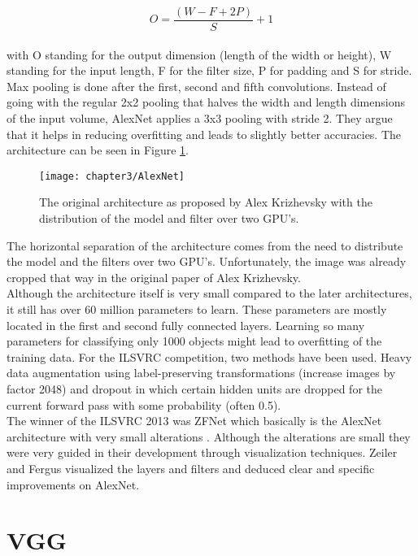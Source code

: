 \[ O = {\frac{(W - F + 2P)}{S}} + 1 \] \\

with O standing for the output dimension (length of the width or height), W standing for the input length, F for the filter size, P for padding and S for stride. Max pooling is done after the first, second and fifth convolutions. Instead of going with the regular 2x2 pooling that halves the width and length dimensions of the input volume, AlexNet applies a 3x3 pooling with stride 2. They argue that it helps in reducing overfitting and leads to slightly better accuracies. The architecture can be seen in Figure \ref{fig:AlexNet}. \\

\begin{figure}[H]
  \centering
  \caption{The original architecture as proposed by Alex Krizhevsky with the distribution of the model and filter over two GPU's. \cite{krizhevsky2012imagenet}}
  \texttt{[image: chapter3/AlexNet]}
  \label{fig:AlexNet}
\end{figure}

The horizontal separation of the architecture comes from the need to distribute the model and the filters over two GPU's. Unfortunately, the image was already cropped that way in the original paper of Alex Krizhevsky. \\

Although the architecture itself is very small compared to the later architectures, it still has over 60 million parameters to learn. These parameters are mostly located in the first and second fully connected layers. Learning so many parameters for classifying only 1000 objects might lead to overfitting of the training data. For the ILSVRC competition, two methods have been used. Heavy data augmentation using label-preserving transformations (increase images by factor 2048) and dropout in which certain hidden units are dropped for the current forward pass with some probability (often 0.5). \\

The winner of the ILSVRC 2013 was ZFNet which basically is the AlexNet architecture with very small alterations \cite{zeiler2014visualizing}. Although the alterations are small they were very guided in their development through visualization techniques. Zeiler and Fergus visualized the layers and filters and deduced clear and specific improvements on AlexNet.

\section{VGG}

